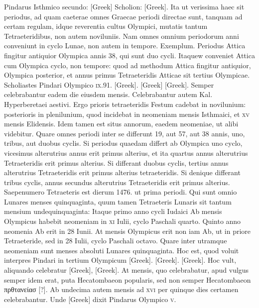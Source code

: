 Pindarus Isthmico secundo:
\textgreek{[Greek]}
Scholion: \textgreek{[Greek]}.
Ita ut verissima haec sit periodus, ad
quam caeterae omnes Graecae periodi directae sunt, tanquam ad certam
regulam, idque reverentia cultus Olympici, mutatis tantum Tetraeteridibus,
non autem noviluniis.
Nam omnes omnium periodorum anni
conveniunt in cyclo Lunae, non autem in tempore.
Exemplum.
Periodus
Attica fingitur antiquior Olympica annis 38, qui sunt duo cycli.
Itaquew conveniet Attica cum Olympica cyclo, non tempore: quod
ad methodum Attica fingitur antiquior, Olympica posterior, et annus
primus Tetraeteridis Atticae sit tertius Olympicae.
Scholiastes Pindari
Olympico \textsc{ix}.91. \textgreek{[Greek]}.
\textgreek{[Greek]}
\textgreek{[Greek]}.
Semper celebrabantur eadem die
eiusdem mensis.
Celebrabantur autem Kal. Hyperberetaei aestivi.
Ergo
prioris tetraeteridis Festum cadebat in novilunium: posterioris in plenilunium,
quod incidebat in neomeniam mensis Isthmaici, et \textsc{xv} mensis
Elidensis.
Idem tamen est situs annorum, eaedem neomeniae, ut alibi
videbitur.
Quare omnes periodi inter se differunt 19, aut 57, aut 38
annis, uno, tribus, aut duobus cyclis.
Si periodus quaedam differt ab
Olympica uno cyclo, vicesimus alterutrius annus erit primus alterius,
et ita quartus annus alterutrius Tetraeteridis erit primus alterius.
Si differant
duobus cyclis, tertius annus alterutrius Tetraeteridis erit primus
alterius tetraeteridis.
Si denique differant tribus cyclis, annus secundus
alterutrius Tetraeteridis erit primus alterius.
Saepenumero Tetraeteris
est dierum 1476. ut prima periodi.
Qui sunt omnio Lunares
menses quinquaginta, quum tamen Tetraeteris Lunaris sit tantum
mensium undequinquaginta: Itaque primo anno cycli Iudaici Ab mensis
Olympicus habebit neomeniam in \textsc{xi} Iulii, cyclo Paschali quarto.
Quinto
anno neomenia Ab erit in 28 Iunii.
At mensis Olympicus erit non iam
Ab, ut in priore Tetraeteride, sed in 28 Iulii, cyclo Paschali octavo.
Quare inter utramque neomeniam sunt menses absoluti
 Lunares quinquaginta.
Hoc est, quod voluit interpres Pindari in tertium Olympicum
\textgreek{[Greek]}.
\textgreek{[Greek]}.
\textgreek{[Greek]}.
Hoc
vult, aliquando celebratur \textgreek{[Greek]}, \textgreek{[Greek]}.
At mensis, quo celebrabatur, apud vulgus semper
idem erat, puta Hecatombaeon popularis, sed non semper Hecatombaeon
\textgreek{πρθτανείασ [?]}.
Ab undecima autem mensis ad \textsc{xvi} per quinque
dies certamen celebrabantur.
Unde \textgreek{[Greek]} dixit Pindarus
Olympico \textsc{v}.

